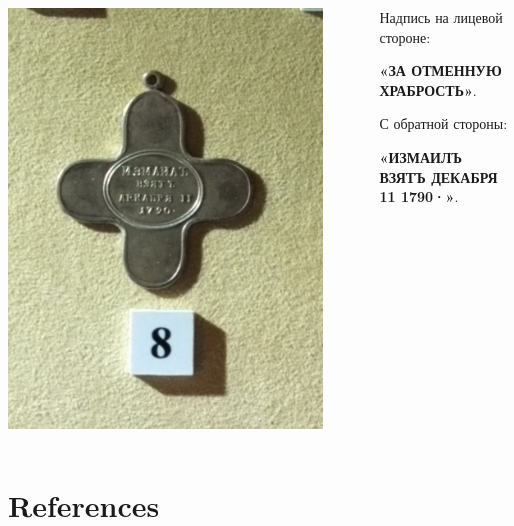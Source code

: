\begin{frame}{}
	\begin{columns}
		\begin{column}{0.45\textwidth}
			\includegraphics[width=0.9\textwidth]{medal3.jpg}
		\end{column}
		\begin{column}{0.45\textwidth}

			Надпись на лицевой стороне:

			\textbf{«ЗА ОТМЕННУЮ ХРАБРОСТЬ»}.

			С обратной стороны:

			\textbf{«ИЗМАИЛЪ ВЗЯТЪ ДЕКАБРЯ 11 1790·»}.

		\end{column}
	\end{columns}
\end{frame}

\section{References}


